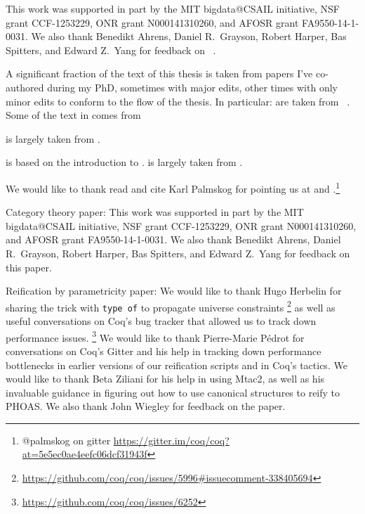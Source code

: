 This work was supported in part by the MIT bigdata@CSAIL initiative, NSF grant CCF-1253229, ONR grant N000141310260, and AFOSR grant FA9550-14-1-0031.
We also thank Benedikt Ahrens, Daniel R.~Grayson, Robert Harper, Bas Spitters, and Edward Z.~Yang for feedback on ~\cite{category-coq-experience}.

A significant fraction of the text of this thesis is taken from papers I've co-authored during my PhD, sometimes with major edits, other times with only minor edits to conform to the flow of the thesis.
In particular:
 are taken from ~\cite{category-coq-experience}.
Some of the text in  comes from ~\cite{category-coq-experience}

 is largely taken from .

 is based on the introduction to \textcite{reification-by-parametricity}.
 is largely taken from \textcite{reification-by-parametricity}.

We would like to thank read and cite Karl Palmskog for pointing us at \textcite{Should1999Lamport} and \textcite{Formalising2018Paulson}.\footnote{@palmskog on gitter \url{https://gitter.im/coq/coq?at=5e5ec0ae4eefc06dcf31943f}}

Category theory paper: This work was supported in part by the MIT bigdata@CSAIL initiative, NSF grant CCF-1253229, ONR grant N000141310260, and AFOSR grant FA9550-14-1-0031.  We also thank Benedikt Ahrens, Daniel R.~Grayson, Robert Harper, Bas Spitters, and Edward Z.~Yang for feedback on this paper.

Reification by parametricity paper:
We would like to thank Hugo Herbelin for sharing the trick with \texttt{type of} to propagate universe constraints%
\footnote{%
    \url{https://github.com/coq/coq/issues/5996\#issuecomment-338405694}%
}
as well as useful conversations on Coq's bug tracker that allowed us to track down performance issues.%
\footnote{%
    \url{https://github.com/coq/coq/issues/6252}%
}
We would like to thank Pierre-Marie P\'edrot for conversations on Coq's Gitter and his help in tracking down performance bottlenecks in earlier versions of our reification scripts and in Coq's tactics.
We would like to thank Beta Ziliani for his help in using Mtac2, as well as his invaluable guidance in figuring out how to use canonical structures to reify to PHOAS.
We also thank John Wiegley for feedback on the paper.

